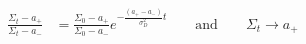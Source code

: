 \documentclass[12pt]{article}
\theoremstyle{plain}
\theoremstyle{definition}
\theoremstyle{remark}
\newcommand{\ra}{\rightarrow}
\begin{document}
\begin{align*}
  \frac{\Sigma_t-a_+}{\Sigma_t-a_-}
  &=
  \frac{\Sigma_0-a_+}{\Sigma_0-a_-}
  e^{-\frac{(a_+-a_-)}{\sigma^2_D}t}
  \qquad
  \text{and}
  \qquad
  \Sigma_t\ra a_+
\end{align*}
\end{document}
